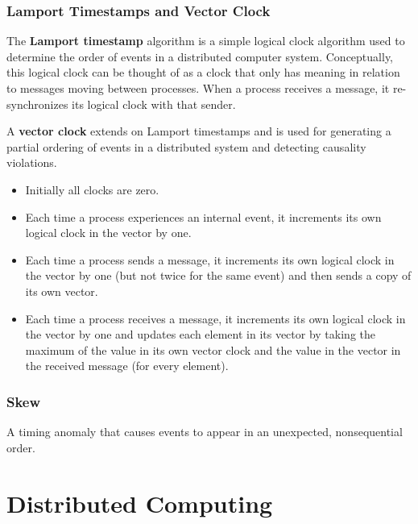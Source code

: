 \documentclass{article}
\begin{document}
    \subsubsection{Lamport Timestamps and Vector Clock}
    The \textbf{Lamport timestamp} algorithm is a simple logical clock algorithm used to determine the order of events in a distributed computer system. Conceptually, this logical clock can be thought of as a clock that only has meaning in relation to messages moving between processes. When a process receives a message, it re-synchronizes its logical clock with that sender.
    
    A \textbf{vector clock} extends on Lamport timestamps and is used for generating a partial ordering of events in a distributed system and detecting causality violations. 
    
    \begin{itemize}
        \item Initially all clocks are zero.
        
        \item  Each time a process experiences an internal event, it increments its own logical clock in the vector by one.
        
        \item Each time a process sends a message, it increments its own logical clock in the vector by one (but not twice for the same event) and then sends a copy of its own vector.
        
        \item Each time a process receives a message, it increments its own logical clock in the vector by one and updates each element in its vector by taking the maximum of the value in its own vector clock and the value in the vector in the received message (for every element).
    \end{itemize}
    
    \subsubsection{Skew}
    A timing anomaly that causes events to appear in an unexpected, nonsequential order.

\newpage    
\section{Distributed Computing}
\end{document}
